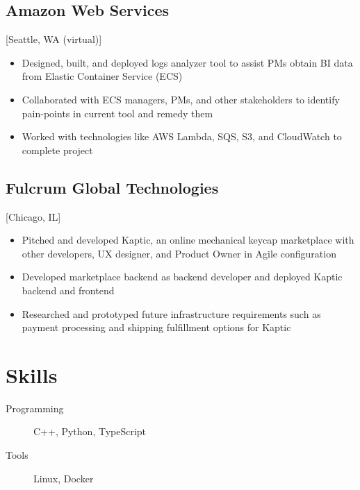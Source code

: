\documentclass{mycv}
\begin{document}
\subsection{Amazon Web Services}[Seattle, WA (virtual)]
\begin{positions}
\end{positions}
\begin{itemize}
  \item Designed, built, and deployed logs analyzer tool to assist PMs obtain BI data from Elastic Container Service (ECS)
  \item Collaborated with ECS managers, PMs, and other stakeholders to identify pain-points in current tool and remedy them
  \item Worked with technologies like AWS Lambda, SQS, S3, and CloudWatch to complete project
\end{itemize}

\subsection{Fulcrum Global Technologies}[Chicago, IL]
\begin{positions}
\end{positions}
\begin{itemize}
  \item Pitched and developed Kaptic, an online mechanical keycap marketplace with other developers, UX designer, and Product Owner in Agile configuration
  \item Developed marketplace backend as backend developer and deployed Kaptic backend and frontend
  \item Researched and prototyped future infrastructure requirements such as payment processing and shipping fulfillment options for Kaptic
\end{itemize}

\section{Skills}

\begin{description}
  \item[Programming] C++, Python, TypeScript
  \item[Tools] Linux, Docker
\end{description}
\end{document}
